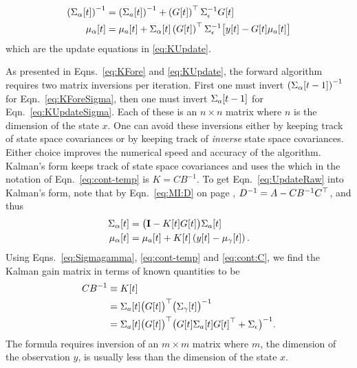 \begin{enumerate}
  \begin{subequations}
    \label{eq:FUpdateAgain}
    \begin{align}
      \left( {\Sigma_\alpha}{[t]} \right)^{-1} &= \left(
        {\Sigma_a}{[t]} \right)^{-1} + \left( {G}{[t]}
        \right)^\top \Sigma_\epsilon^{-1} {G}{[t]} \\
      {\mu_\alpha}{[t]} &= {\mu_a}{[t]} +
      {\Sigma_{\alpha}}{[t]} \left( {G}{[t]} \right)^\top
      \Sigma_\epsilon^{-1} \big[{y}{[t]} - {G}{[t]}
      {\mu_a}{[t]}\big]
    \end{align}
  \end{subequations}
  which are the update equations in \eqref{eq:KUpdate}.
\end{enumerate}

As presented in Eqns.~\eqref{eq:KFore} and \eqref{eq:KUpdate}, the
forward algorithm requires two matrix inversions per iteration.  First
one must invert $\left( {\Sigma_\alpha}{[t-1]}\right)^{-1}$ for
Eqn.~\eqref{eq:KForeSigma}, then one must invert ${\Sigma_a}{[t-1]}$
for Eqn.~\eqref{eq:KUpdateSigma}.  Each of these is an $n\times n$
matrix where $n$ is the dimension of the state $x$.  One can avoid
these inversions either by keeping track of state space covariances or
by keeping track of \emph{inverse} state space covariances.  Either
choice improves the numerical speed and accuracy of the algorithm.
Kalman's form keeps track of state space covariances and uses the
\emph{} %
%
which in the notation of Eqn.~\eqref{eq:cont-temp} is $K=CB^{-1}$.  To
get Eqn.~\eqref{eq:UpdateRaw} into Kalman's form, note that by
Eqn.~\eqref{eq:MI:D} on page \pageref{eq:MI:D},
$D^{-1} = A -CB^{-1} C^\top$, and thus
\begin{subequations}
  \label{eq:KalmanGain}
  \begin{align}
    {\Sigma_\alpha}{[t]} &= \big({\bf I} - {K}{[t]} {G}{[t]}
    \big) {\Sigma_a}{[t]} \\
    {\mu_\alpha}{[t]} &= {\mu_a}{[t]} + {K}{[t]} \left(
      {y}{[t]} - {\mu_\gamma}{[t]}\right).
  \end{align}
\end{subequations}
Using Eqns.~\eqref{eq:Sigmagamma}, \eqref{eq:cont-temp} and
\eqref{eq:cont:C}, we find the Kalman gain matrix in terms of known
quantities to be
\begin{align*}
  CB^{-1} &\equiv {K}{[t]}\\
  &= {\Sigma_{a}}{[t]} \big({G}{[t]} \big)^\top \big(
  {\Sigma_\gamma}{[t]}\big)^{-1}\\
  &= {\Sigma_{a}}{[t]} \big({G}{[t]} \big)^\top \big({G}{[t]}{\Sigma_a}{[t]}{G}{[t]}^\top +
    \Sigma_\epsilon \big)^{-1}.
\end{align*}
The formula requires inversion of an $m\times m$ matrix where $m$, the
dimension of the observation $y$, is usually less than the dimension of
the state $x$.

